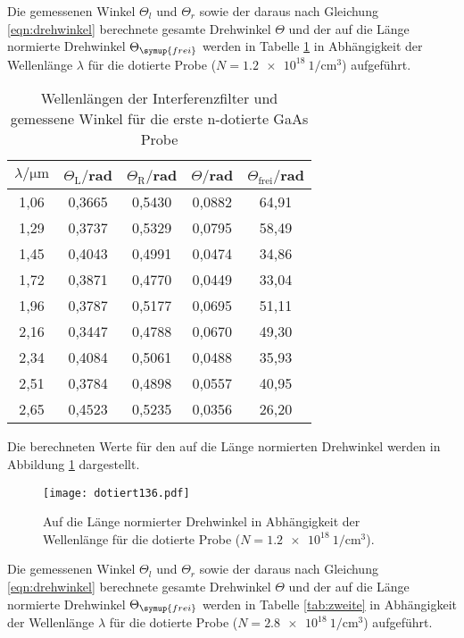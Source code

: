 Die gemessenen Winkel $\Theta_l$ und $\Theta_r$ sowie der daraus nach Gleichung
\ref{eqn:drehwinkel} berechnete gesamte Drehwinkel $\Theta$ und der auf die Länge
normierte Drehwinkel $\Theta_\symup{frei}$ werden in Tabelle \ref{tab:erste} in Abhängigkeit
der Wellenlänge $\lambda$ für die dotierte Probe ($N = \SI{1.2e18}{1\per\centi\meter^3}$) aufgeführt.

\begin{table}[H]
  \centering
  \caption{Wellenlängen der Interferenzfilter und gemessene Winkel für die erste n-dotierte GaAs Probe}
  \label{tab:erste}
  \begin{tabular}{c c c c c}
    \toprule
    $\lambda/\mathrm{\mu m}$ & $\Theta_{\mathrm{L}}/$rad & $\Theta_{\mathrm{R}}/$rad  & $\Theta /$rad & $\Theta_{\mathrm{frei}}/$rad\\
    \midrule
    1,06  & 0,3665 & 0,5430 & 0,0882 & 64,91 \\
    1,29  & 0,3737 & 0,5329 & 0,0795 & 58,49 \\
    1,45  & 0,4043 & 0,4991 & 0,0474 & 34,86 \\
    1,72  & 0,3871 & 0,4770 & 0,0449 & 33,04 \\
    1,96  & 0,3787 & 0,5177 & 0,0695 & 51,11 \\
    2,16  & 0,3447 & 0,4788 & 0,0670 & 49,30 \\
    2,34  & 0,4084 & 0,5061 & 0,0488 & 35,93 \\
    2,51  & 0,3784 & 0,4898 & 0,0557 & 40,95 \\
    2,65  & 0,4523 & 0,5235 & 0,0356 & 26,20 \\
    \bottomrule
  \end{tabular}
\end{table}



Die berechneten Werte für den auf die Länge normierten Drehwinkel werden
in Abbildung \ref{fig:rein} dargestellt.
\begin{figure}[H]
  \centering
  \texttt{[image: dotiert136.pdf]}
  \caption{Auf die Länge normierter Drehwinkel in Abhängigkeit der Wellenlänge für die dotierte Probe ($N = \SI{1.2e18}{1\per\centi\meter^3}$).}
  \label{fig:rein}
\end{figure}

Die gemessenen Winkel $\Theta_l$ und $\Theta_r$ sowie der daraus nach Gleichung
\ref{eqn:drehwinkel} berechnete gesamte Drehwinkel $\Theta$ und der auf die Länge
normierte Drehwinkel $\Theta_\symup{frei}$ werden in Tabelle \ref{tab:zweite} in Abhängigkeit
der Wellenlänge $\lambda$ für die dotierte Probe ($N = \SI{2.8e18}{1\per\centi\meter^3}$) aufgeführt.


